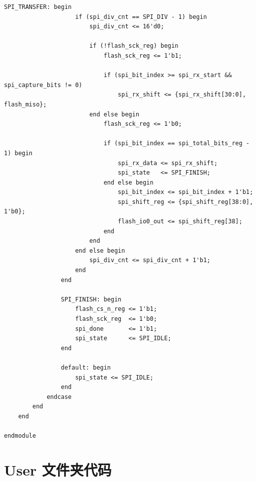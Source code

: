 \documentclass[a4paper,10pt]{article}
\begin{document}
\begin{lstlisting}[caption=w25q128_ctrl.v]
                SPI_TRANSFER: begin
                    if (spi_div_cnt == SPI_DIV - 1) begin
                        spi_div_cnt <= 16'd0;

                        if (!flash_sck_reg) begin
                            flash_sck_reg <= 1'b1;

                            if (spi_bit_index >= spi_rx_start && spi_capture_bits != 0)
                                spi_rx_shift <= {spi_rx_shift[30:0], flash_miso};
                        end else begin
                            flash_sck_reg <= 1'b0;

                            if (spi_bit_index == spi_total_bits_reg - 1) begin
                                spi_rx_data <= spi_rx_shift;
                                spi_state   <= SPI_FINISH;
                            end else begin
                                spi_bit_index <= spi_bit_index + 1'b1;
                                spi_shift_reg <= {spi_shift_reg[38:0], 1'b0};
                                flash_io0_out <= spi_shift_reg[38];
                            end
                        end
                    end else begin
                        spi_div_cnt <= spi_div_cnt + 1'b1;
                    end
                end

                SPI_FINISH: begin
                    flash_cs_n_reg <= 1'b1;
                    flash_sck_reg  <= 1'b0;
                    spi_done       <= 1'b1;
                    spi_state      <= SPI_IDLE;
                end

                default: begin
                    spi_state <= SPI_IDLE;
                end
            endcase
        end
    end

endmodule

\end{lstlisting}

\section{User 文件夹代码}
\end{document}
